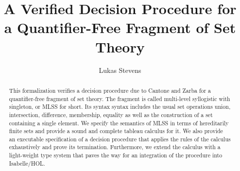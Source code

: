 \documentclass[11pt,a4paper]{report}
\begin{document}
\title{A Verified Decision Procedure for a Quantifier-Free Fragment of Set Theory}
\author{Lukas Stevens}
\maketitle

\begin{abstract}
  This formalization verifies a decision procedure due to Cantone and Zarba for a quantifier-free fragment of set theory.
  The fragment is called multi-level syllogistic with singleton, or MLSS for short.
  Its syntax syntax includes the usual set operations union, intersection, difference, membership, equality as well as the construction of a set containing a single element.
  We specify the semantics of MLSS in terms of hereditarily finite sets and provide a sound and complete tableau calculus for it. 
  We also provide an executable specification of a decision procedure that applies the rules of the calculus exhaustively and prove its termination.
  Furthermore, we extend the calculus with a light-weight type system that paves the way for an integration of the procedure into Isabelle/HOL.
\end{abstract}

\newpage

\tableofcontents



\nocite{*}


\end{document}

